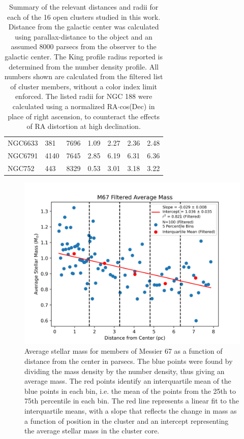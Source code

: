\documentclass[onecolumn,table,xcdraw,super]{aastex631}
\begin{document}
\begin{table}[!h]
\begin{tabular}{lllllll}
NGC6633 & 381  & 7696  & 1.09 & 2.27 & 2.36  & 2.48 \\
NGC6791 & 4140 & 7645  & 2.85 & 6.19 & 6.31  & 6.36 \\
NGC752  & 443  & 8329  & 0.53 & 3.01 & 3.18  & 3.22 \\ \bottomrule
\end{tabular}
\caption{Summary of the relevant distances and radii for each of the 16 open clusters studied in this work. Distance from the galactic center was calculated using parallax-distance to the object and an assumed 8000 parsecs from the observer to the galactic center. The King profile radius reported is determined from the number density profile. All numbers shown are calculated from the filtered list of cluster members, without a color index limit enforced. The listed radii for NGC 188 were calculated using a normalized RA$\cdot$cos(Dec) in place of right ascension, to counteract the effects of RA distortion at high declination.}
\label{tab:radii}
\end{table}

\begin{figure}[]
    \centering
      \includegraphics[width=4.75in]{figures/M67_averageMass_filtered.png}
    \caption{Average stellar mass for members of Messier 67 as a function of distance from the center in parsecs. The blue points were found by dividing the mass density by the number density, thus giving an average mass. The red points identify an interquartile mean of the blue points in each bin, i.e. the mean of the points from the 25th to 75th percentile in each bin. The red line represents a linear fit to the interquartile means, with a slope that reflects the change in mass as a function of position in the cluster and an intercept representing the average stellar mass in the cluster core.}
    \label{fig:M67_average_mass}
\end{figure}
\end{document}
